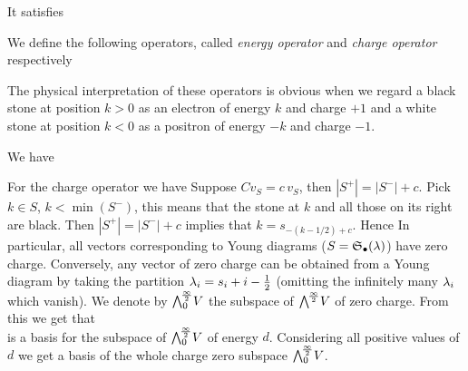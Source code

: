 \documentclass[10pt]{beamer}
\begin{document}
\begin{frame}

\begin{definition}
\vspace{-5pt}
\end{definition}

It satisfies\\[-15pt]

\begin{definition}
We define the following operators, called \emph{energy operator} and \emph{charge operator} respectively\\[-15pt]
\end{definition}

The physical interpretation of these operators is obvious when we regard a black stone at position $k>0$ as an electron of energy $k$ and charge $+1$ and a white stone at position $k<0$ as a positron of energy $-k$ and charge $-1$. 

We have\\[-15pt]

\end{frame}

\begin{frame}

For the charge operator we have 
Suppose $Cv_S=c\,v_S$, then $|S^+|=|S^-|+c$. Pick $k\in S$, $k<\min (S^-)$, this means that the stone at $k$ and all those on its right are black. Then $|S^+|=|S^-|+c$ implies that $k=s_{-(k-1/2)+c}$. Hence
In particular, all vectors corresponding to Young diagrams ($S=\mathfrak S_\bullet(\lambda)$) have zero charge. Conversely, any vector of zero charge can be obtained from a Young diagram by taking the partition $\lambda_i=s_i+i-\frac12$ (omitting the infinitely many $\lambda_i$ which vanish). We denote by $\bigwedge^{\!\frac\infty2}_0\!V$ the subspace of $\bigwedge^{\!\frac\infty2}\!V$ of zero charge. From this we get that\\[-15pt]
is a basis for the subspace of $\bigwedge^{\!\frac\infty2}_0\!V$ of energy $d$. Considering all positive values of $d$ we get a basis of the whole charge zero subspace $\bigwedge^{\!\frac\infty2}_0\!V$. 

\end{frame}
\end{document}
